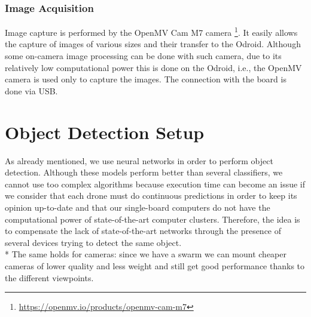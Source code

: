 \documentclass[10pt,conference,compsocconf]{IEEEtran}
\begin{document}
\subsubsection{Image Acquisition}
Image capture is performed by the OpenMV Cam M7 camera \footnote{\url{https://openmv.io/products/openmv-cam-m7}}. It easily allows the capture of images of various sizes and their transfer to the Odroid. Although some on-camera image processing  can be done with such camera, due to its relatively low computational power this is done on the Odroid, i.e., the OpenMV camera is used only to capture the images. The connection with the board is done via USB.
\section{Object Detection Setup}
\label{sec:obj_det_setup}
As already mentioned, we use neural networks in order to perform object detection. Although these models perform better than several classifiers, we cannot use too complex algorithms because execution time can become an issue if we consider that each drone must do continuous predictions in order to keep its opinion up-to-date and that our single-board computers do not have the computational power of state-of-the-art computer clusters. Therefore, the idea is to compensate the lack of state-of-the-art networks through the presence of several devices trying to detect the same object.\\*
The same holds for cameras: since we have a swarm we can mount cheaper cameras of lower quality and less weight and still get good performance thanks to the different viewpoints.
\end{document}
